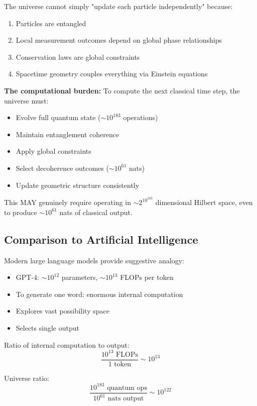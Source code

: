 The universe cannot simply "update each particle independently" because:
\begin{enumerate}
\item Particles are entangled
\item Local measurement outcomes depend on global phase relationships  
\item Conservation laws are global constraints
\item Spacetime geometry couples everything via Einstein equations
\end{enumerate}

\textbf{The computational burden:}
To compute the next classical time step, the universe must:
\begin{itemize}
\item Evolve full quantum state ($\sim 10^{183}$ operations)
\item Maintain entanglement coherence
\item Apply global constraints
\item Select decoherence outcomes ($\sim 10^{61}$ nats)
\item Update geometric structure consistently
\end{itemize}

This MAY genuinely require operating in $\sim 2^{10^{183}}$ dimensional Hilbert space, even to produce $\sim 10^{61}$ nats of classical output.

\subsection{Comparison to Artificial Intelligence}

Modern large language models provide suggestive analogy:
\begin{itemize}
\item GPT-4: $\sim 10^{12}$ parameters, $\sim 10^{13}$ FLOPs per token
\item To generate one word: enormous internal computation
\item Explores vast possibility space
\item Selects single output
\end{itemize}

Ratio of internal computation to output:
\begin{equation}
\frac{10^{13} \text{ FLOPs}}{1 \text{ token}} \sim 10^{13}
\end{equation}

Universe ratio:
\begin{equation}
\frac{10^{183} \text{ quantum ops}}{10^{61} \text{ nats output}} \sim 10^{122}
\end{equation}

